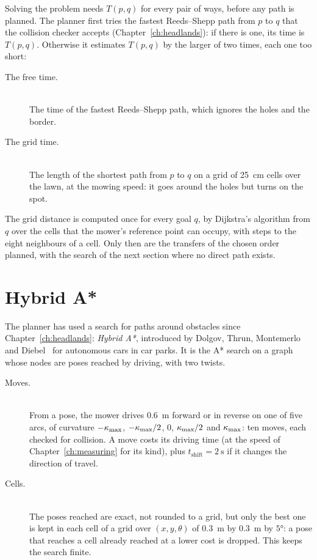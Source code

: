 Solving the problem needs $T(p, q)$ for every pair of ways, before any path
is planned. The planner first tries the fastest Reeds--Shepp path from $p$
to $q$ that the collision checker accepts (Chapter~\ref{ch:headlands}): if
there is one, its time is $T(p, q)$. Otherwise it estimates $T(p, q)$ by
the larger of two times, each one too short:

\begin{description}
  \item[The free time.]
    \leavevmode\\
    The time of the fastest Reeds--Shepp path, which ignores the holes and
    the border.
  \item[The grid time.]
    \leavevmode\\
    The length of the shortest path from $p$ to $q$ on a grid of
    \SI{25}{\centi\metre} cells over the lawn, at the mowing speed: it goes
    around the holes but turns on the spot.
\end{description}

The grid distance is computed once for every goal $q$, by Dijkstra's
algorithm from $q$ over the cells that the mower's reference point can
occupy, with steps to the eight neighbours of a cell. Only then are the
transfers of the chosen order planned, with the search of the next section
where no direct path exists.

\section{Hybrid A*}
\label{sec:hybrid}

The planner has used a search for paths around obstacles since
Chapter~\ref{ch:headlands}: \emph{Hybrid A*}, introduced by Dolgov, Thrun,
Montemerlo and Diebel~\cite{dolgov2010path} for autonomous cars in car parks.
It is the A* search on a graph whose nodes are poses reached by driving,
with two twists.

\begin{description}
  \item[Moves.]
    \leavevmode\\
    From a pose, the mower drives \SI{0.6}{\metre} forward or in reverse
    on one of five arcs, of curvature $-\kappa_{\max}$, $-\kappa_{\max}/2$, $0$, $\kappa_{\max}/2$
    and $\kappa_{\max}$: ten moves, each checked for collision. A move costs its
    driving time (at the speed of Chapter~\ref{ch:measuring} for its kind),
    plus $t_{\mathrm{shift}} = \SI{2}{\second}$ if it changes the direction
    of travel.
  \item[Cells.]
    \leavevmode\\
    The poses reached are exact, not rounded to a grid, but only the best
    one is kept in each cell of a grid over $(x, y, \theta)$ of
    \SI{0.3}{\metre} by \SI{0.3}{\metre} by $5°$: a pose that reaches a
    cell already reached at a lower cost is dropped. This keeps the search
    finite.
\end{description}

